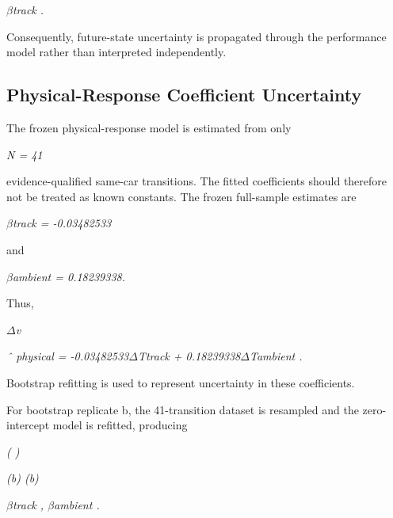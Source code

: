 \begin{center}\textit{\ensuremath{\beta}track .}\end{center}

Consequently, future-state uncertainty is propagated through the performance model rather than interpreted independently.

\subsection{Physical-Response Coefficient Uncertainty}
The frozen physical-response model is estimated from only

\begin{center}\textit{N = 41}\end{center}

evidence-qualified same-car transitions. The fitted coefficients should therefore not be treated as known constants. The frozen full-sample estimates are

\begin{center}\textit{\ensuremath{\beta}track = -0.03482533}\end{center}

and

\begin{center}\textit{\ensuremath{\beta}ambient = 0.18239338.}\end{center}

Thus,

\begin{center}\textit{\ensuremath{\Delta}v}\end{center}

\begin{center}\textit{ˆ physical = -0.03482533\ensuremath{\Delta}Ttrack + 0.18239338\ensuremath{\Delta}Tambient .}\end{center}

Bootstrap refitting is used to represent uncertainty in these coefficients.

For bootstrap replicate b, the 41-transition dataset is resampled and the zero-intercept model is refitted, producing

\begin{center}\textit{(                    )}\end{center}

\begin{center}\textit{(b)      (b)}\end{center}

\begin{center}\textit{\ensuremath{\beta}track , \ensuremath{\beta}ambient .}\end{center}

